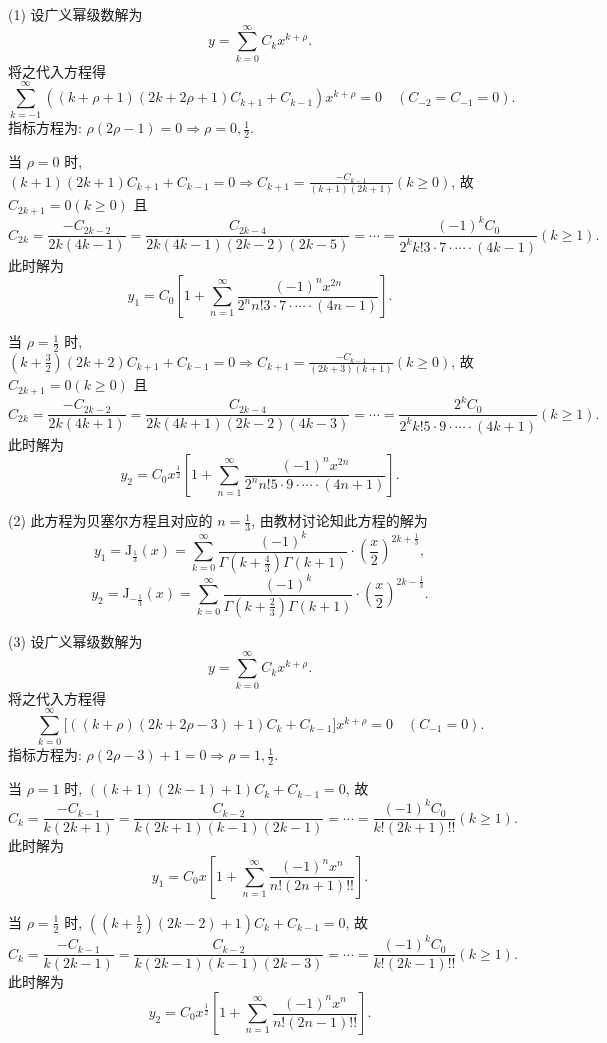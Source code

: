 \begin{solution}
  (1) 设广义幂级数解为
  \[y=\sum_{k=0}^{\infty}C_kx^{k+\rho}.\]
  将之代入方程得
  \[\sum_{k=-1}^{\infty}\left((k+\rho+1)(2k+2\rho+1)C_{k+1}+C_{k-1}\right)x^{k+\rho}=0
  \quad (C_{-2}=C_{-1}=0).\]
  指标方程为: $\rho(2\rho-1)=0\Rightarrow\rho=0,\frac{1}{2}$.

  当 $\rho=0$ 时, $(k+1)(2k+1)C_{k+1}+C_{k-1}=0\Rightarrow C_{k+1}=\frac{-C_{k-1}}{(k+1)(2k+1)}(k\geq 0)$, 故 $C_{2k+1}=0(k\geq 0)$ 且
  \[C_{2k}=\frac{-C_{2k-2}}{2k(4k-1)}=\frac{C_{2k-4}}{2k(4k-1)(2k-2)(2k-5)}=\cdots=\frac{(-1)^kC_0}{2^kk!3\cdot7\cdot\cdots\cdot(4k-1)}(k\geq 1).\]
  此时解为
  \[y_1=C_0\left[1+\sum_{n=1}^{\infty}\frac{(-1)^nx^{2n}}{2^nn!3\cdot7\cdot\cdots\cdot(4n-1)}\right].\]

  当 $\rho=\frac{1}{2}$ 时, 
  $(k+\frac{3}{2})(2k+2)C_{k+1}+C_{k-1}=0\Rightarrow C_{k+1}=\frac{-C_{k-1}}{(2k+3)(k+1)}(k\geq0)$, 
  故 $C_{2k+1}=0(k\geq 0)$ 且
  \[C_{2k}=\frac{-C_{2k-2}}{2k(4k+1)}=\frac{C_{2k-4}}{2k(4k+1)(2k-2)(4k-3)}=\cdots=\frac{2^kC_0}{2^kk!5\cdot9\cdot\cdots\cdot(4k+1)}(k\geq 1).\]
  此时解为
  \[y_2=C_0x^{\frac{1}{2}}\left[1+\sum_{n=1}^{\infty}\frac{(-1)^nx^{2n}}{2^nn!5\cdot9\cdot\cdots\cdot(4n+1)}\right].\]

  (2) 此方程为贝塞尔方程且对应的 $n=\frac{1}{3}$, 由教材讨论知此方程的解为
  \[y_1=\mathrm{J}_{\frac{1}{3}}(x)=\sum_{k=0}^{\infty}\frac{(-1)^k}{\Gamma\left(k+\frac{4}{3}\right)\Gamma(k+1)}\cdot\left(\frac{x}{2}\right)^{2k+\frac{1}{3}},\]
  \[y_2=\mathrm{J}_{-\frac{1}{3}}(x)=\sum_{k=0}^{\infty}\frac{(-1)^k}{\Gamma\left(k+\frac{2}{3}\right)\Gamma(k+1)}\cdot\left(\frac{x}{2}\right)^{2k-\frac{1}{3}}.\]

  (3) 设广义幂级数解为
  \[y=\sum_{k=0}^{\infty}C_kx^{k+\rho}.\]
  将之代入方程得
  \[\sum_{k=0}^{\infty}\big[((k+\rho)(2k+2\rho-3)+1)C_k+C_{k-1}\big]x^{k+\rho}=0
    \quad (C_{-1}=0).\]
  指标方程为: $\rho(2\rho-3)+1=0\Rightarrow\rho=1,\frac{1}{2}$.

  当 $\rho=1$ 时, $((k+1)(2k-1)+1)C_k+C_{k-1}=0$, 故
  \[C_k=\frac{-C_{k-1}}{k(2k+1)}=\frac{C_{k-2}}{k(2k+1)(k-1)(2k-1)}=\cdots=\frac{(-1)^kC_0}{k!(2k+1)!!}(k\geq 1).\]
  此时解为
  \[y_1=C_0x\left[1+\sum_{n=1}^{\infty}\frac{(-1)^nx^n}{n!(2n+1)!!}\right].\]

  当 $\rho=\frac{1}{2}$ 时, $((k+\frac{1}{2})(2k-2)+1)C_k+C_{k-1}=0$, 故
  \[C_k=\frac{-C_{k-1}}{k(2k-1)}=\frac{C_{k-2}}{k(2k-1)(k-1)(2k-3)}=\cdots=\frac{(-1)^kC_0}{k!(2k-1)!!}(k\geq 1).\]
  此时解为
  \[y_2=C_0x^{\frac{1}{2}}\left[1+\sum_{n=1}^{\infty}\frac{(-1)^nx^n}{n!(2n-1)!!}\right].\]


\end{solution}
